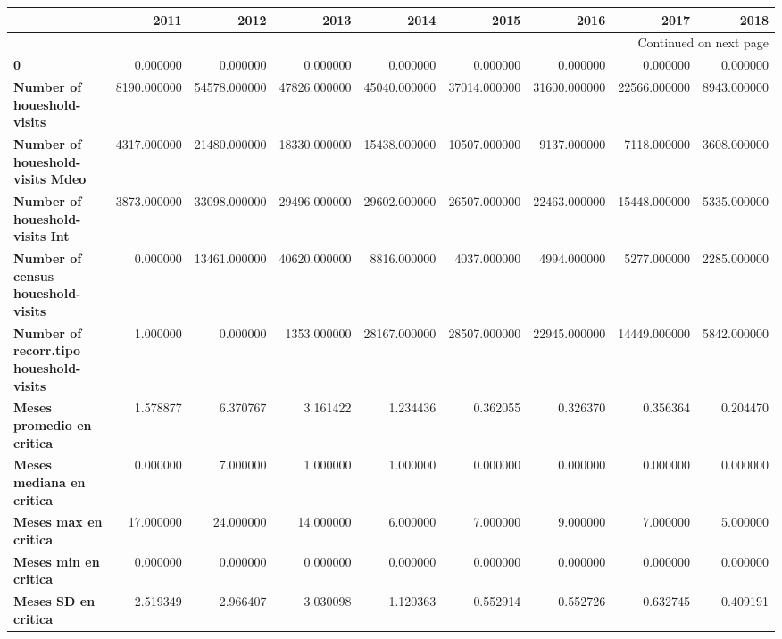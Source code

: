 \begin{longtable}{lrrrrrrrr}
\toprule
{} &         2011 &          2012 &          2013 &          2014 &          2015 &          2016 &          2017 &         2018 \\
\midrule
\endhead
\midrule
\multicolumn{9}{r}{{Continued on next page}} \\
\midrule
\endfoot

\bottomrule
\endlastfoot
\textbf{0                                     } &     0.000000 &      0.000000 &      0.000000 &      0.000000 &      0.000000 &      0.000000 &      0.000000 &     0.000000 \\
\textbf{Number of houeshold-visits            } &  8190.000000 &  54578.000000 &  47826.000000 &  45040.000000 &  37014.000000 &  31600.000000 &  22566.000000 &  8943.000000 \\
\textbf{Number of houeshold-visits Mdeo       } &  4317.000000 &  21480.000000 &  18330.000000 &  15438.000000 &  10507.000000 &   9137.000000 &   7118.000000 &  3608.000000 \\
\textbf{Number of houeshold-visits Int        } &  3873.000000 &  33098.000000 &  29496.000000 &  29602.000000 &  26507.000000 &  22463.000000 &  15448.000000 &  5335.000000 \\
\textbf{Number of census houeshold-visits     } &     0.000000 &  13461.000000 &  40620.000000 &   8816.000000 &   4037.000000 &   4994.000000 &   5277.000000 &  2285.000000 \\
\textbf{Number of recorr.tipo houeshold-visits} &     1.000000 &      0.000000 &   1353.000000 &  28167.000000 &  28507.000000 &  22945.000000 &  14449.000000 &  5842.000000 \\
\textbf{Meses promedio en critica             } &     1.578877 &      6.370767 &      3.161422 &      1.234436 &      0.362055 &      0.326370 &      0.356364 &     0.204470 \\
\textbf{Meses mediana en critica              } &     0.000000 &      7.000000 &      1.000000 &      1.000000 &      0.000000 &      0.000000 &      0.000000 &     0.000000 \\
\textbf{Meses max en critica                  } &    17.000000 &     24.000000 &     14.000000 &      6.000000 &      7.000000 &      9.000000 &      7.000000 &     5.000000 \\
\textbf{Meses min en critica                  } &     0.000000 &      0.000000 &      0.000000 &      0.000000 &      0.000000 &      0.000000 &      0.000000 &     0.000000 \\
\textbf{Meses SD en critica                   } &     2.519349 &      2.966407 &      3.030098 &      1.120363 &      0.552914 &      0.552726 &      0.632745 &     0.409191 \\
\end{longtable}
